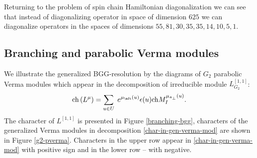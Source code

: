 Returning to the problem of spin chain Hamiltonian diagonalization we can see that instead of diagonalizing operator in space of dimension $625$ we can diagonalize operators in the spaces of dimensions $55, 81, 30, 35, 35, 14, 10, 5, 1$.

\subsection{Branching and parabolic Verma modules}
\label{sec:branch-parab-verma}

We illustrate the generalized BGG-resolution by the diagrams of $G_{2}$ parabolic Verma modules which appear in the decomposition of irreducible module $L^{[1,1]}_{G_{2}}$:
\begin{equation}
\mathrm{ch}\left( L^{\mu }\right) =\sum_{u\in U}\;e^{\mu _{\aft}\left(
u\right) }\epsilon (u)\mathrm{ch}M_{I}^{\mu _{\frak{a}_{\perp }}\left(
u\right) }.  \label{char-in-gen-verma-mod}
\end{equation}
The character of $L^{[1,1]}$ is presented in Figure \ref{branching-bgg}, characters of the generalized Verma modules in decomposition \eqref{char-in-gen-verma-mod} are shown in Figure \ref{g2-pverma}. Characters in the upper row appear in \eqref{char-in-gen-verma-mod} with positive sign and in the lower row -- with negative.


